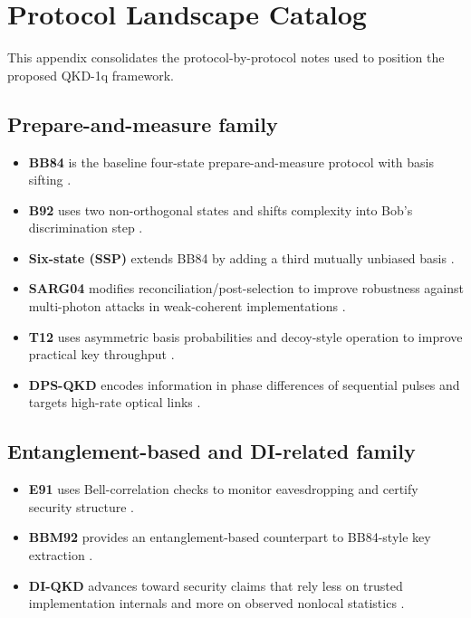 \documentclass[a4paper,twocolumn,11pt,unpublished]{quantumarticle}
\begin{document}
\appendix
\section{Protocol Landscape Catalog}
This appendix consolidates the protocol-by-protocol notes used to position the
proposed QKD-1q framework.

\subsection{Prepare-and-measure family}
\begin{itemize}
    \item \textbf{BB84} is the baseline four-state prepare-and-measure
    protocol with basis sifting \cite{BB84}.
    \item \textbf{B92} uses two non-orthogonal states and shifts complexity
    into Bob's discrimination step \cite{B92}.
    \item \textbf{Six-state (SSP)} extends BB84 by adding a third mutually
    unbiased basis \cite{SSP}.
    \item \textbf{SARG04} modifies reconciliation/post-selection to improve
    robustness against multi-photon attacks in weak-coherent implementations
    \cite{SARG04}.
    \item \textbf{T12} uses asymmetric basis probabilities and decoy-style
    operation to improve practical key throughput \cite{T12}.
    \item \textbf{DPS-QKD} encodes information in phase differences of
    sequential pulses and targets high-rate optical links \cite{DPS2002}.
\end{itemize}

\subsection{Entanglement-based and DI-related family}
\begin{itemize}
    \item \textbf{E91} uses Bell-correlation checks to monitor eavesdropping
    and certify security structure \cite{ekert1991quantum}.
    \item \textbf{BBM92} provides an entanglement-based counterpart to
    BB84-style key extraction \cite{B92ent}.
    \item \textbf{DI-QKD} advances toward security claims that rely less on
    trusted implementation internals and more on observed nonlocal statistics
    \cite{DIQKDReview2023}.
\end{itemize}
\end{document}
